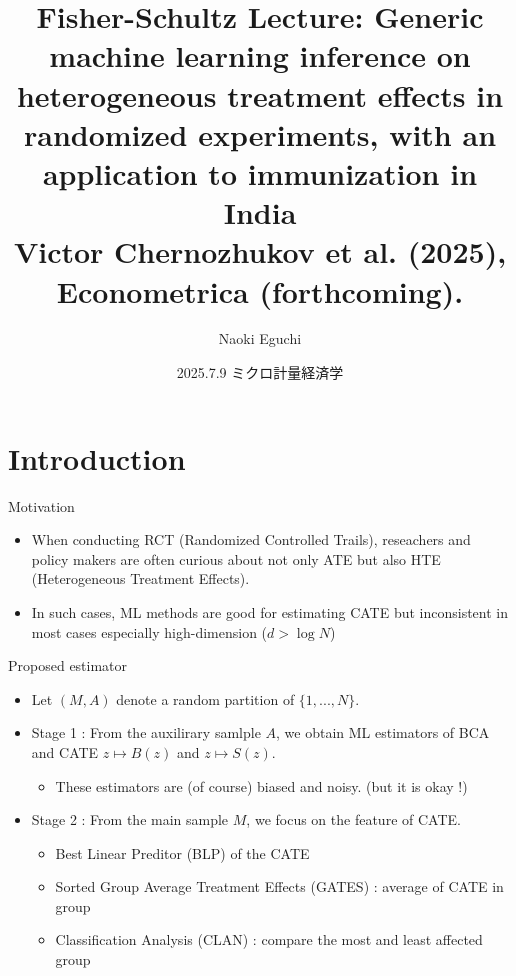 \documentclass[xcolor=svgnames,aspectratio=169]{beamer}
\begin{document}
 

\title{Fisher-Schultz Lecture: Generic machine learning inference on heterogeneous treatment effects in randomized experiments, with an application to immunization in India \\ \small{Victor Chernozhukov et al. (2025), Econometrica (forthcoming).}}
\author{Naoki Eguchi}          
\date{2025.7.9 ミクロ計量経済学}

\begin{frame}                  
    \titlepage                     
\end{frame}

\section{Introduction}

\begin{frame}{Motivation}
    \begin{itemize}
        \item When conducting RCT (Randomized Controlled Trails), reseachers and policy makers are often curious about not only ATE but also HTE (Heterogeneous Treatment Effects).
        \item In such cases, ML methods are good for estimating CATE but inconsistent in most cases especially high-dimension ($d>\log N$)
    \end{itemize}
\end{frame}

\begin{frame}{Proposed estimator}
    \begin{itemize}
        \item Let $(M,A)$ denote a random partition of $\{1,...,N\}$.
        \item Stage 1 : From the auxilirary samlple $A$, we obtain ML estimators of BCA and CATE $z\mapsto B(z)$ and $z\mapsto S(z)$.
        \begin{itemize}
            \item These estimators are (of course) biased and noisy. (but it is okay !) 
        \end{itemize}
        \item Stage 2 : From the main sample $M$, we focus on the \alert{feature} of CATE.
        \begin{itemize}
            \item Best Linear Preditor (BLP) of the CATE
            \item Sorted Group Average Treatment Effects (GATES) : average of CATE in group
            \item Classification Analysis (CLAN) : compare the most and least affected group
        \end{itemize}
    \end{itemize}
\end{frame}
\end{document}
